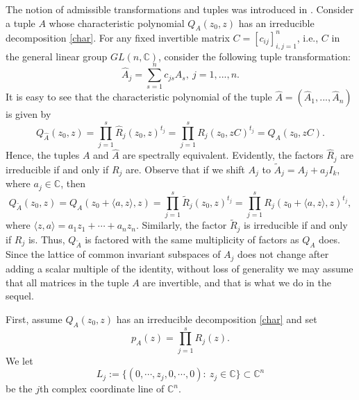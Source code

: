 \documentclass[draft, 12pt, reqno]{amsart}
\newcommand{\C}{{\mathbb C}}
\newcommand{\Pp}{{\mathbb P}}
\numberwithin{equation}{section}
\theoremstyle{plain}
\begin{document}
The notion of admissible transformations and tuples was introduced in \cite{S1, SY}. Consider a tuple $A$ whose characteristic polynomial $Q_A(z_0,z)$ has an irreducible decomposition \eqref{char}. For any fixed invertible matrix $C=[c_{ij}]_{i,j=1}^n$, i.e., $C$ in the general linear group $GL(n,\C)$, consider the following tuple transformation:
\begin{equation}\label{transform}
\widehat{A}_j=\displaystyle \sum_{s=1}^n c_{js}A_s, \ j=1,...,n. 
\end{equation} 
\noindent It is easy to see that the characteristic polynomial of the tuple $\widehat{A}=(\widehat{A}_1,...,\widehat{A}_n)$ is given by
\begin{equation}\label{irrfactor}
Q_{\widehat{A}}(z_0,z)= \displaystyle \prod_{j=1}^s \widehat{R}_j(z_0,z)^{t_j}=\displaystyle \prod_{j=1}^s R_j(z_0,zC)^{t_j}=Q_A(z_0, zC). 
\end{equation}
Hence, the tuples $A$ and $\widehat{A}$ are spectrally equivalent. Evidently, the factors $\widehat{R}_j$ are irreducible if and only if $R_j$ are. Observe that if we shift $A_j$ to $\widetilde{A}_j=A_j+a_jI_k$, where $a_j\in \C$, then 
\begin{equation}\label{char1}
Q_{\widetilde{A}}(z_0,z)=Q_A(z_0+\langle a,z\rangle, z)=\displaystyle \prod_{j=1}^s \widetilde{R}_j(z_0,z)^{t_j}= \prod_{j=1}^s R_j(z_0+\langle a,z\rangle,z)^{t_j},	
\end{equation}
where $\langle z,a\rangle=a_1z_1+\cdots +a_nz_n$. Similarly, the factor $\widetilde{R}_j$ is irreducible if and only if $R_j$ is. Thus, $Q_{\widetilde{A}}$ is factored with the same multiplicity of factors as $Q_{A}$ does. Since the lattice of common invariant subspaces of $A_j$ does not change after adding a scalar multiple of the identity, without loss of generality we may assume that all  matrices in the tuple $A$ are invertible, and that is what we do in the sequel.

First, assume $Q_A(z_0,z)$ has an irreducible decomposition \eqref{char} and set
\[p_A(z)=\prod_{j=1}^s R_j(z).\] We let 
\begin{equation}\label{L}
L_j:=\big\{ (0,\cdots,z_j, 0,\cdots,0): \ z_j\in \C \big\}\subset \C^{n}
\end{equation} be the $j$th complex coordinate line of $\C^n$.

\end{document}
